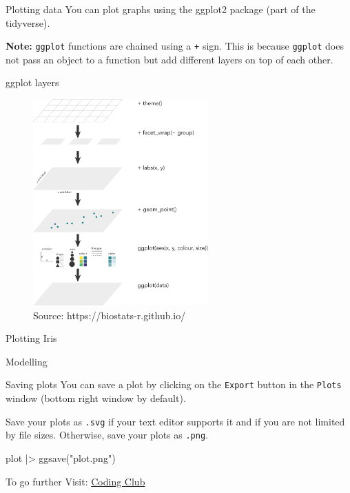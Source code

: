 \documentclass[
  ignorenonframetext,
  aspectratio=169,
]{beamer}
\newenvironment{Shaded}{\begin{snugshade}}{\end{snugshade}}
\newcommand{\FunctionTok}[1]{\textcolor[rgb]{0.28,0.35,0.67}{#1}}
\newcommand{\NormalTok}[1]{\textcolor[rgb]{0.00,0.23,0.31}{#1}}
\newcommand{\SpecialCharTok}[1]{\textcolor[rgb]{0.37,0.37,0.37}{#1}}
\newcommand{\StringTok}[1]{\textcolor[rgb]{0.13,0.47,0.30}{#1}}
\begin{document}
\begin{frame}[fragile]{Plotting data}
\label{plotting-data}
You can plot graphs using the ggplot2 package (part of the tidyverse).

\textbf{Note:} \texttt{ggplot} functions are chained using a \texttt{+}
sign. This is because \texttt{ggplot} does not pass an object to a
function but add different layers on top of each other.
\end{frame}

\begin{frame}{ggplot layers}
\label{ggplot-layers}
\begin{figure}[H]

{\centering \includegraphics[width=0.6\textwidth,height=\textheight]{Intro_R_files/mediabag/ggplot_setup.png}

}

\caption{Source: https://biostats-r.github.io/}

\end{figure}%
\end{frame}

\begin{frame}{Plotting Iris}
\label{plotting-iris}
\end{frame}

\begin{frame}{Modelling}
\label{modelling}
\end{frame}

\begin{frame}[fragile]{Saving plots}
\label{saving-plots}
You can save a plot by clicking on the \texttt{Export} button in the
\texttt{Plots} window (bottom right window by default).

Save your plots as \texttt{.svg} if your text editor supports it and if
you are not limited by file sizes. Otherwise, save your plots as
\texttt{.png}.

\begin{Shaded}
\begin{Highlighting}[]
\NormalTok{plot }\SpecialCharTok{|\textgreater{}} \FunctionTok{ggsave}\NormalTok{(}\StringTok{"plot.png"}\NormalTok{)}
\end{Highlighting}
\end{Shaded}
\end{frame}

\begin{frame}{To go further}
\label{to-go-further}
Visit: \href{https://ourcodingclub.github.io/}{Coding Club}
\end{frame}
\end{document}
